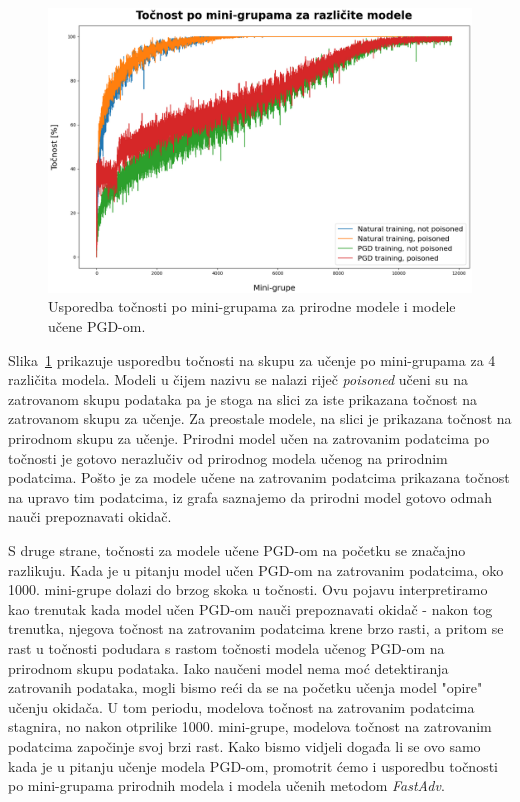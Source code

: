 \documentclass[times, utf8, zavrsni, numeric]{fer}
\begin{document}
\begin{figure}[htb]
    \centering
    \includegraphics[scale=0.4]{../stats/train_accuracy_comparison_nat_pgd.png}
    \caption{Usporedba točnosti po mini-grupama za prirodne modele i modele učene PGD-om.}
    \label{fig:pgd_nat_poisoned_comparison}
\end{figure}

\pagebreak

Slika~\ref{fig:pgd_nat_poisoned_comparison} prikazuje usporedbu točnosti na skupu za učenje po mini-grupama za 4 različita modela.
Modeli u čijem nazivu se nalazi riječ \textit{poisoned} učeni su na zatrovanom skupu podataka pa je stoga na slici za iste prikazana točnost na zatrovanom skupu za učenje.
Za preostale modele, na slici je prikazana točnost na prirodnom skupu za učenje.
Prirodni model učen na zatrovanim podatcima po točnosti je gotovo nerazlučiv od prirodnog modela učenog na prirodnim podatcima.
Pošto je za modele učene na zatrovanim podatcima prikazana točnost na upravo tim podatcima, iz grafa saznajemo da prirodni model gotovo odmah nauči prepoznavati okidač.

S druge strane, točnosti za modele učene PGD-om na početku se značajno razlikuju. 
Kada je u pitanju model učen PGD-om na zatrovanim podatcima, oko 1000. mini-grupe dolazi do brzog skoka u točnosti.
Ovu pojavu interpretiramo kao trenutak kada model učen PGD-om nauči prepoznavati okidač - nakon tog trenutka, njegova točnost na zatrovanim podatcima krene brzo rasti, 
a pritom se rast u točnosti podudara s rastom točnosti modela učenog PGD-om na prirodnom skupu podataka.
Iako naučeni model nema moć detektiranja zatrovanih podataka, mogli bismo reći da se na početku učenja model "opire" učenju okidača.
U tom periodu, modelova točnost na zatrovanim podatcima stagnira, no nakon otprilike 1000. mini-grupe, modelova točnost na zatrovanim podatcima započinje svoj brzi rast. 
Kako bismo vidjeli događa li se ovo samo kada je u pitanju učenje modela PGD-om, promotrit ćemo i usporedbu točnosti po mini-grupama prirodnih modela i modela učenih metodom \textit{FastAdv}.
\end{document}
